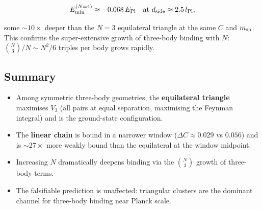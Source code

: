 \begin{equation}
  E_{\rm min}^{(N=4)} \approx -0.068\,E_{\rm Pl} \quad
  \text{at } d_{\rm side}\approx 2.5\,l_{\rm Pl},
\end{equation}

some $\sim10\times$ deeper than the $N=3$ equilateral triangle at the
same $C$ and $m_{\rm sp}$.  This confirms the super-extensive growth of
three-body binding with $N$: $\binom{N}{3}/N \sim N^2/6$ triples per
body grows rapidly.

\subsection{Summary}

\begin{itemize}
  \item Among symmetric three-body geometries, the \textbf{equilateral
    triangle} maximises $V_3$ (all pairs at equal separation, maximising
    the Feynman integral) and is the ground-state configuration.
  \item The \textbf{linear chain} is bound in a narrower window
    ($\Delta C\approx 0.029$ vs $0.056$) and is $\sim27\times$ more
    weakly bound than the equilateral at the window midpoint.
  \item Increasing $N$ dramatically deepens binding via the
    $\binom{N}{3}$ growth of three-body terms.
  \item The falsifiable prediction is unaffected: triangular clusters
    are the dominant channel for three-body binding near Planck scale.
\end{itemize}
